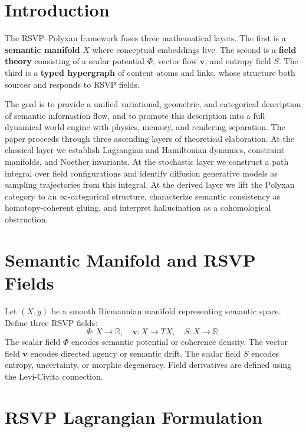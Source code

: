 \documentclass[11pt]{article}
\begin{document}
\newpage
\tableofcontents
\newpage

\section{Introduction}

The RSVP--Polyxan framework fuses three mathematical layers.
The first is a \textbf{semantic manifold} $X$ where conceptual embeddings
live.
The second is a \textbf{field theory} consisting of a scalar potential
$\Phi$, vector flow $\mathbf{v}$, and entropy field $S$.
The third is a \textbf{typed hypergraph} of content atoms and links, whose
structure both sources and responds to RSVP fields.

The goal is to provide a unified variational, geometric, and categorical
description of semantic information flow, and to promote this description
into a full dynamical world engine with physics, memory, and rendering
separation.
The paper proceeds through three ascending layers of theoretical
elaboration.
At the classical layer we establish Lagrangian and Hamiltonian dynamics,
constraint manifolds, and Noether invariants.
At the stochastic layer we construct a path integral over field
configurations and identify diffusion generative models as sampling
trajectories from this integral.
At the derived layer we lift the Polyxan category to an
$\infty$-categorical structure, characterize semantic consistency as
homotopy-coherent gluing, and interpret hallucination as a cohomological
obstruction.

\section{Semantic Manifold and RSVP Fields}

Let $(X,g)$ be a smooth Riemannian manifold representing semantic space.
Define three RSVP fields:
\[
\Phi: X\to\mathbb{R},\quad
\mathbf{v}: X\to T X,\quad
S: X\to \mathbb{R}.
\]
The scalar field $\Phi$ encodes semantic potential or coherence density.
The vector field $\mathbf{v}$ encodes directed agency or semantic drift.
The scalar field $S$ encodes entropy, uncertainty, or morphic degeneracy.
Field derivatives are defined using the Levi-Civita connection.

\section{RSVP Lagrangian Formulation}
\end{document}
